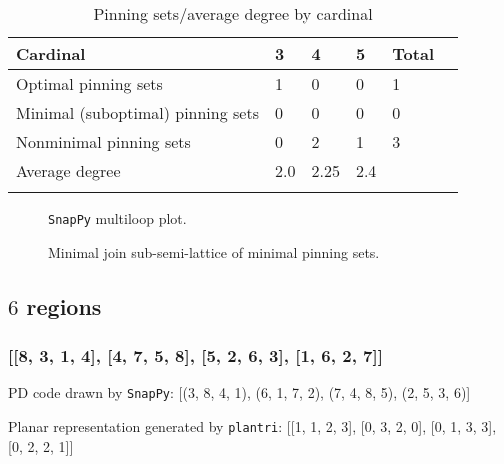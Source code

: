 \documentclass{article}%
\begin{document}
\begin{table}[ht]
	\caption{Pinning sets/average degree by cardinal}
	\centering
	\renewcommand{\arraystretch}{1.5}
	\begin{tabularx}{\textwidth}{lXXXXX}
		\toprule
			Cardinal & 3 & 4 & 5 & Total\\
			\hline
			Optimal pinning sets & 1 & 0 & 0 & 1 \\
			Minimal (suboptimal) pinning sets & 0 & 0 & 0 & 0 \\
			Nonminimal pinning sets & 0 & 2 & 1 & 3 \\
			Average degree & 2.0 & 2.25 & 2.4 &  \\
		\bottomrule \\ 
	\end{tabularx}
\end{table}

\begin{multicols}{2}
\begin{figure}[H]
\centering

\caption{\texttt{SnapPy} multiloop plot.}
\label{fig:tex/img/[[3, 6, 4, 1], [5, 2, 6, 3], [4, 2, 5, 1]].svg}
\end{figure}
\columnbreak

\begin{figure}[H]
\centering
\scalebox{0.8}{}
\caption{Minimal join sub-semi-lattice of minimal pinning sets.}
\label{fig:tex/img/[[3, 6, 4, 1], [5, 2, 6, 3], [4, 2, 5, 1]].pgf}
\end{figure}
\end{multicols}

\newpage

\subsection{$6$ regions}

\subsubsection{[[8, 3, 1, 4], [4, 7, 5, 8], [5, 2, 6, 3], [1, 6, 2, 7]]}

{\small\noindent PD code drawn by \texttt{SnapPy}: [(3, 8, 4, 1), (6, 1, 7, 2), (7, 4, 8, 5), (2, 5, 3, 6)]}

{\small\noindent Planar representation generated by \texttt{plantri}: [[1, 1, 2, 3], [0, 3, 2, 0], [0, 1, 3, 3], [0, 2, 2, 1]]}
\end{document}

